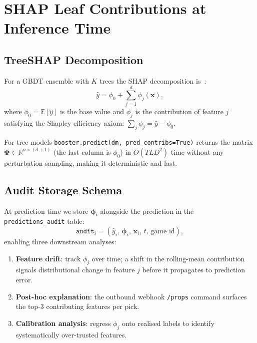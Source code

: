 \documentclass[conference]{IEEEtran}
\begin{document}
\section{SHAP Leaf Contributions at Inference Time}
\label{sec:shap}

\subsection{TreeSHAP Decomposition}

For a GBDT ensemble with $K$ trees the SHAP decomposition
is~\cite{lundberg2018}:
\begin{equation}
  \hat{y} = \phi_0 + \sum_{j=1}^{d} \phi_j(\mathbf{x}),
\label{eq:shap}
\end{equation}
where $\phi_0 = \mathbb{E}[\hat{y}]$ is the base value and
$\phi_j$ is the contribution of feature $j$ satisfying
the Shapley efficiency axiom:
$\sum_j \phi_j = \hat{y} - \phi_0$.

For tree models \texttt{booster.predict(dm, pred\_contribs=True)}
returns the matrix $\boldsymbol{\Phi} \in \mathbb{R}^{n \times (d+1)}$
(the last column is $\phi_0$) in $O(TLD^2)$ time without any
perturbation sampling, making it deterministic and fast.

\subsection{Audit Storage Schema}

At prediction time we store $\boldsymbol{\phi}_i$ alongside the
prediction in the \texttt{predictions\_audit} table:
\begin{equation}
  \texttt{audit}_i = (\hat{y}_i,\, \boldsymbol{\phi}_i,\,
                       \mathbf{x}_i,\, t,\, \text{game\_id}),
\label{eq:audit}
\end{equation}
enabling three downstream analyses:
\begin{enumerate}
  \item \textbf{Feature drift}: track $\phi_j$ over time; a shift in
        the rolling-mean contribution signals distributional change in
        feature $j$ before it propagates to prediction error.
  \item \textbf{Post-hoc explanation}: the outbound webhook \texttt{/props}
        command surfaces the top-3 contributing features per pick.
  \item \textbf{Calibration analysis}: regress $\phi_j$ onto realised
        labels to identify systematically over-trusted features.
\end{enumerate}
\end{document}
